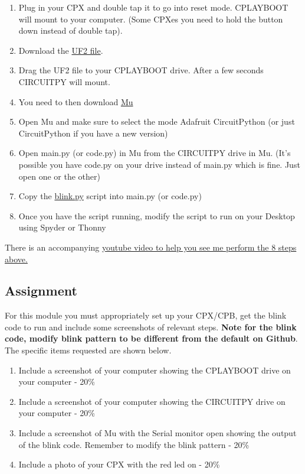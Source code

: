 \begin{enumerate}[itemsep=-5pt]
\item Plug in your CPX and double tap it to go into reset
  mode. CPLAYBOOT will mount to your computer. (Some CPXes you need to hold the button down instead of double tap).
\item Download the \href{https://circuitpython.org/downloads}{UF2
  file}.
\item Drag the UF2 file to your CPLAYBOOT drive. After a few seconds
  CIRCUITPY will mount.
\item You need to then download
  \href{https://codewith.mu/en/download}{Mu}
\item Open Mu and make sure to select the mode Adafruit CircuitPython (or just CircuitPython if you have a new version)
\item Open main.py (or code.py) in Mu from the CIRCUITPY drive in Mu. (It's possible you have code.py on your drive instead of main.py which is fine. Just open one or the other)
\item Copy the \href{https://github.com/cmontalvo251/Microcontrollers/blob/master/Circuit_Playground/CircuitPython/blink.py}{blink.py} script into main.py (or code.py)
\item Once you have the script running, modify the script to run on
  your Desktop using Spyder or Thonny
\end{enumerate}

There is an accompanying
\href{https://www.youtube.com/watch?v=XFvLn6rwm3I}{youtube video to
  help you see me perform the 8 steps above.}

\subsection{Assignment}

For this module you must appropriately set up your CPX/CPB, get the blink code to run and include some screenshots of relevant steps. {\bf Note for the blink code, modify blink pattern to be different from the default on Github}. The specific items requested are shown below.



\begin{enumerate}[itemsep=-5pt]
\item Include a screenshot of your computer showing the CPLAYBOOT drive on your computer - 20\%
\item Include a screenshot of your computer showing the CIRCUITPY drive on your computer - 20\%
\item Include a screenshot of Mu with the Serial monitor open showing the output of the blink code. Remember to modify the blink pattern - 20\%
\item Include a photo of your CPX with the red led on - 20\%
\end{enumerate}
